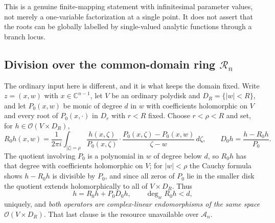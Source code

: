 \documentclass[11pt,letterpaper]{article}
\theoremstyle{definition}
\theoremstyle{remark}
\newcommand{\C}{\mathbb C}
\newcommand{\A}{\mathscr A}
\newcommand{\RR}{\mathscr R}
\newcommand{\OO}{\mathcal O}
\numberwithin{equation}{section}
\begin{document}
This is a genuine finite-mapping statement with infinitesimal parameter
values, not merely a one-variable factorization at a single point. It does
not assert that the roots can be globally labelled by single-valued
analytic functions through a branch locus.

\subsection{Division over the common-domain ring $\RR_n$}
\label{analytic:subsec:divR}
The ordinary input here is different, and it is what keeps the domain
fixed. Write $z=(x,w)$ with $x\in\C^{n-1}$, let $V$ be an ordinary polydisk
and $D_R=\{|w|<R\}$, and let $P_0(x,w)$ be monic of degree $d$ in $w$ with
coefficients holomorphic on $V$ and every root of $P_0(x,\cdot)$ in $D_r$
with $r<R$ fixed. Choose $r<\rho<R$ and set, for $h\in\OO(V\times D_R)$,
\begin{equation}\label{analytic:eq:ordinaryR}
 R_0h(x,w)=\frac1{2\pi i}\int_{|\zeta|=\rho}
 \frac{h(x,\zeta)}{P_0(x,\zeta)}\cdot
 \frac{P_0(x,\zeta)-P_0(x,w)}{\zeta-w}\,d\zeta ,
 \qquad
 D_0h=\frac{h-R_0h}{P_0}.
\end{equation}
The quotient involving $P_0$ is a polynomial in $w$ of degree below $d$, so
$R_0h$ has that degree with coefficients holomorphic on $V$; for $|w|<\rho$
the Cauchy formula shows $h-R_0h$ is divisible by $P_0$, and since all zeros
of $P_0$ lie in the smaller disk the quotient extends holomorphically to all
of $V\times D_R$. Thus
\begin{equation}\label{analytic:eq:ordinarydivision}
 h=R_0h+P_0D_0h,\qquad \deg_wR_0h<d,
\end{equation}
uniquely, and \emph{both operators are complex-linear endomorphisms of the
same space} $\OO(V\times D_R)$. That last clause is the resource unavailable
over $\A_n$.
\end{document}
